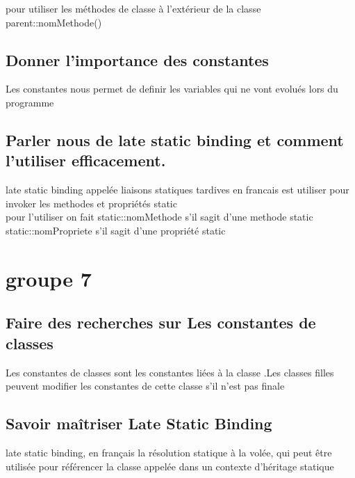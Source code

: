 \documentclass[12pt,b5paper]{article}
\begin{document}
pour  utiliser les méthodes de classe à l’extérieur de la classe \\
parent::nomMethode()\\
\subsection{ Donner l’importance des constantes
}
Les constantes nous permet de definir les variables qui ne vont evolués lors du programme

\subsection{Parler nous de late static binding et comment l’utiliser efficacement.} 
late static binding   appelée liaisons statiques tardives en francais est utiliser pour \\
invoker les methodes et propriétés static\\
pour l'utiliser on fait static::nomMethode s'il sagit d'une methode static\\
static::nomPropriete s'il sagit d'une propriété static



\section{groupe 7}
\subsection{Faire des recherches sur Les constantes de classes}
 Les constantes de classes sont les constantes liées à la classe .Les classes filles peuvent modifier les constantes de cette classe s'il n'est pas finale\\
\subsection{Savoir maîtriser Late Static Binding}
late static binding, en français la résolution statique à la volée, qui peut être utilisée pour référencer la classe appelée dans un contexte d'héritage statique\\
\end{document}
